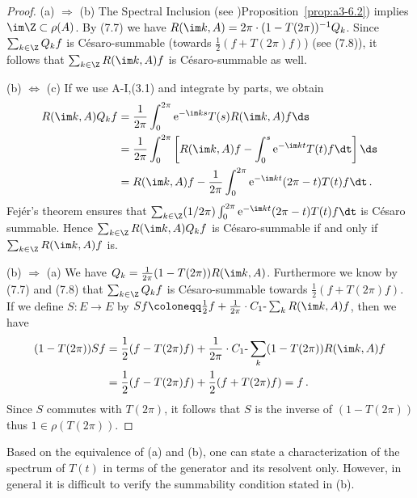 \begin{proof}
(a) $\Rightarrow$ (b) The Spectral Inclusion (see )Proposition~\ref{prop:a3-6.2}) implies $\im\Z \subset \rho(A)$.
By (7.7) we have $R(\im k,A) = 2\pi\cdot(1-T(2\pi))^{-1}Q_{k}$.
Since $\sum_{k\in\Z} Q_{k}f$ is Césaro-summable (towards $\frac{1}{2}(f + T(2\pi)f)$) (see (7.8)), it follows that $\sum_{k\in\Z} R(\im k,A)f$ is Césaro-summable as well.

(b) $\Leftrightarrow$ (c) If we use A-I,(3.1) and integrate by parts, we obtain
\begin{align*}
R(\im k,A)Q_{k}f &= \frac{1}{2\pi}\int_{0}^{2\pi} \mathrm{e}^{-\im ks} T(s)R(\im k,A)f \ds \\
&= \frac{1}{2\pi}\int_{0}^{2\pi} \left[R(\im k,A)f - \int_{0}^{s} \mathrm{e}^{-\im kt} T(t)f \dt\right] \ds \\
&= R(\im k,A)f - \frac{1}{2\pi}\int_{0}^{2\pi} \mathrm{e}^{-\im kt} (2\pi-t) T(t)f \dt\,.
\end{align*}
Fejér's theorem ensures that $\sum_{k\in\Z} (1/2\pi)\int_{0}^{2\pi} \mathrm{e}^{-\im kt} (2\pi-t) T(t)f \dt$ is Césaro summable.
Hence $\sum_{k\in\Z} R(\im k,A)Q_{k}f$ is Césaro-summable if and only if $\sum_{k\in\Z} R(\im k,A)f$ is.

(b) $\Rightarrow$ (a) We have $Q_{k} = \frac{1}{2\pi}(1 - T(2\pi))R(\im k,A)$.
Furthermore we know by (7.7) and (7.8) that $\sum_{k\in\Z} Q_{k}f$ is Césaro-summable towards $\frac{1}{2}(f + T(2\pi)f)$.
If we define $S \colon E \to E$ by $Sf \coloneqq \frac{1}{2}f + \frac{1}{2\pi}\cdot C_{1}\text{-}\sum_k R(\im k,A)f$, then we have
\begin{align*}
(1 - T(2\pi))Sf &= \frac{1}{2}(f - T(2\pi)f) + \frac{1}{2\pi}\cdot C_{1}\text{-}\sum_k (1 - T(2\pi))R(\im k,A)f \\
&= \frac{1}{2}(f - T(2\pi)f) + \frac{1}{2}(f + T(2\pi)f) = f\,.
\end{align*}
Since $S$ commutes with $T(2\pi)$, it follows that $S$ is the inverse of $(1 - T(2\pi))$ thus $1 \in \rho(T(2\pi))$.
\end{proof}
Based on the equivalence of (a) and (b), one can state a characterization of the spectrum of $T(t)$ in terms of the generator and its resolvent only.
However, in general it is difficult to verify the summability condition stated in (b).

